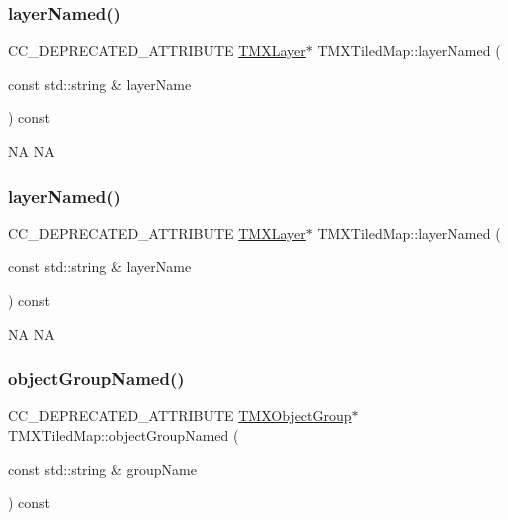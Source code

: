 \subsubsection{\texorpdfstring{layer\+Named()}{layerNamed()}\hspace{0.1cm}{\footnotesize\ttfamily [1/2]}}
{\footnotesize\ttfamily C\+C\+\_\+\+D\+E\+P\+R\+E\+C\+A\+T\+E\+D\+\_\+\+A\+T\+T\+R\+I\+B\+U\+TE \hyperlink{classTMXLayer}{T\+M\+X\+Layer}$\ast$ T\+M\+X\+Tiled\+Map\+::layer\+Named (\begin{DoxyParamCaption}\item[{const std\+::string \&}]{layer\+Name }\end{DoxyParamCaption}) const\hspace{0.3cm}{\ttfamily [inline]}}

NA  NA \mbox{\label{classTMXTiledMap_a31f870242ee4c67f871f177d4ac74682}} 
\subsubsection{\texorpdfstring{layer\+Named()}{layerNamed()}\hspace{0.1cm}{\footnotesize\ttfamily [2/2]}}
{\footnotesize\ttfamily C\+C\+\_\+\+D\+E\+P\+R\+E\+C\+A\+T\+E\+D\+\_\+\+A\+T\+T\+R\+I\+B\+U\+TE \hyperlink{classTMXLayer}{T\+M\+X\+Layer}$\ast$ T\+M\+X\+Tiled\+Map\+::layer\+Named (\begin{DoxyParamCaption}\item[{const std\+::string \&}]{layer\+Name }\end{DoxyParamCaption}) const\hspace{0.3cm}{\ttfamily [inline]}}

NA  NA \mbox{\label{classTMXTiledMap_a34f4aaf226d7baf1ad1e44880cf2be14}} 
\subsubsection{\texorpdfstring{object\+Group\+Named()}{objectGroupNamed()}\hspace{0.1cm}{\footnotesize\ttfamily [1/2]}}
{\footnotesize\ttfamily C\+C\+\_\+\+D\+E\+P\+R\+E\+C\+A\+T\+E\+D\+\_\+\+A\+T\+T\+R\+I\+B\+U\+TE \hyperlink{classTMXObjectGroup}{T\+M\+X\+Object\+Group}$\ast$ T\+M\+X\+Tiled\+Map\+::object\+Group\+Named (\begin{DoxyParamCaption}\item[{const std\+::string \&}]{group\+Name }\end{DoxyParamCaption}) const\hspace{0.3cm}{\ttfamily [inline]}}

